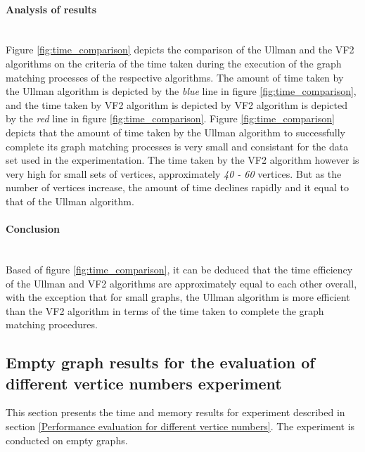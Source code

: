 \paragraph{Analysis of results}\mbox{}\\
Figure \ref{fig:time_comparison} depicts the comparison of the Ullman and the VF2 algorithms on the criteria of the time taken during the execution of the graph matching processes
of the respective algorithms.\newline\newline
The amount of time taken by the Ullman algorithm is depicted by the \textit{blue} line in figure \ref{fig:time_comparison}, and the time taken by VF2 algorithm 
is depicted by VF2 algorithm is depicted by the \textit{red} line in figure \ref{fig:time_comparison}.\newline\newline
Figure \ref{fig:time_comparison} depicts that the amount of time taken by the Ullman algorithm to successfully complete its graph matching processes is very 
small and consistant for the data set used in the experimentation.\newline\newline
The time taken by the VF2 algorithm however is very high for small sets of vertices, approximately \textit{40 - 60} vertices. But as the number of vertices 
increase, the amount of time declines rapidly and it equal to that of the Ullman algorithm.

\paragraph{Conclusion}\mbox{}\\
Based of figure \ref{fig:time_comparison}, it can be deduced that the time efficiency of the Ullman and VF2 algorithms are approximately equal to each other overall,
with the exception that for small graphs, the Ullman algorithm is more efficient than the VF2 algorithm in terms of the time taken to complete the graph matching
procedures.

\subsection{Empty graph results for the evaluation of different vertice numbers experiment}
This section presents the time and memory results for experiment described in section \ref{Performance evaluation for different vertice numbers}. The 
experiment is conducted on empty graphs.
